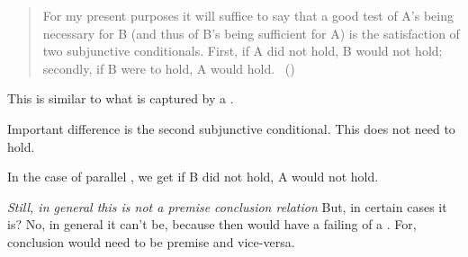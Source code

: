 \begin{note}

  \begin{quote}
    For my present purposes it will suffice to say that a good test of A's being necessary for B (and thus of B's being sufficient for A) is the satisfaction of two subjunctive conditionals.
    First, if A did not hold, B would not hold; secondly, if B were to hold, A would hold.\newline
    \mbox{ }\hfill\mbox{(\citeyear[761]{Sgaravatti:2013wu})}
  \end{quote}
  This is similar to what is captured by a \requ{}.

  Important difference is the second subjunctive conditional.
  This does not need to hold.

  In the case of parallel \requ{}, we get if B did not hold, A would not hold.

  \emph{Still, in general this is not a premise conclusion relation}
  But, in certain cases it is?
  No, in general it can't be, because then would have a failing of a \requ{}.
  For, conclusion would need to be premise and vice-versa.
\end{note}
